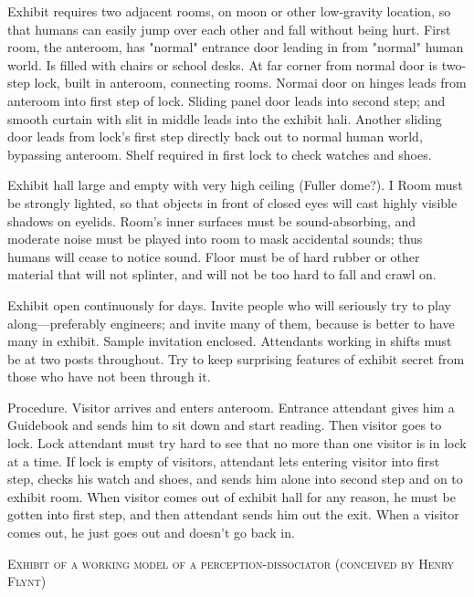 \documentclass[10pt,twoside,draft]{memoir}
\begin{document}
{{Exhibit requires two adjacent rooms, on moon or other low-gravity 
location, so that humans can easily jump over each other and fall without 
being hurt. First room, the anteroom, has "normal" entrance door leading in 
from "normal" human world. Is filled with chairs or school desks. At far 
corner from normal door is two-step lock, built in anteroom, connecting 
rooms. Normai door on hinges leads from anteroom into first step of lock. 
Sliding panel door leads into second step; and smooth curtain with slit in 
middle leads into the exhibit hali. Another sliding door leads from lock's 
first step directly back out to normal human world, bypassing anteroom. 
Shelf required in first lock to check watches and shoes. 

Exhibit hall large and empty with very high ceiling (Fuller dome?). I 
Room must be strongly lighted, so that objects in front of closed eyes will 
cast highly visible shadows on eyelids. Room's inner surfaces must be 
sound-absorbing, and moderate noise must be played into room to mask 
accidental sounds; thus humans will cease to notice sound. Floor must be of 
hard rubber or other material that will not splinter, and will not be too hard 
to fall and crawl on. 

Exhibit open continuously for days. Invite people who will seriously 
try to play along---preferably engineers; and invite many of them, because 
is better to have many in exhibit. Sample invitation enclosed. Attendants 
working in shifts must be at two posts throughout. Try to keep surprising 
features of exhibit secret from those who have not been through it. 

Procedure. Visitor arrives and enters anteroom. Entrance attendant 
gives him a Guidebook and sends him to sit down and start reading. Then 
visitor goes to lock. Lock attendant must try hard to see that no more than 
one visitor is in lock at a time. If lock is empty of visitors, attendant lets 
entering visitor into first step, checks his watch and shoes, and sends him 
alone into second step and on to exhibit room. When visitor comes out of 
exhibit hall for any reason, he must be gotten into first step, and then 
attendant sends him out the exit. When a visitor comes out, he just goes out 
and doesn't go back in. 



\clearpage

\textsc{Exhibit of a working model of a perception-dissociator (conceived by Henry Flynt)}




}}
\end{document}
